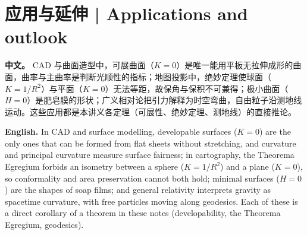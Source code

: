 \documentclass[UTF8,11pt,a4paper]{ctexart}
\newcommand{\APS}[2]{\par\noindent\textbf{中文。} #1\par\noindent\textbf{English.} #2\par\smallskip}
\begin{document}
\section*{应用与延伸 | Applications and outlook}
\APS{CAD 与曲面造型中，可展曲面（$K=0$）是唯一能用平板无拉伸成形的曲面，曲率与主曲率是判断光顺性的指标；地图投影中，绝妙定理使球面（$K=1/R^2$）与平面（$K=0$）无法等距，故保角与保积不可兼得；极小曲面（$H=0$）是肥皂膜的形状；广义相对论把引力解释为时空弯曲，自由粒子沿测地线运动。这些应用都是本讲义各定理（可展性、绝妙定理、测地线）的直接推论。}{In CAD and surface modelling, developable surfaces ($K=0$) are the only ones that can be formed from flat sheets without stretching, and curvature and principal curvature measure surface fairness; in cartography, the Theorema Egregium forbids an isometry between a sphere ($K=1/R^2$) and a plane ($K=0$), so conformality and area preservation cannot both hold; minimal surfaces ($H=0$) are the shapes of soap films; and general relativity interprets gravity as spacetime curvature, with free particles moving along geodesics. Each of these is a direct corollary of a theorem in these notes (developability, the Theorema Egregium, geodesics).}
\end{document}

